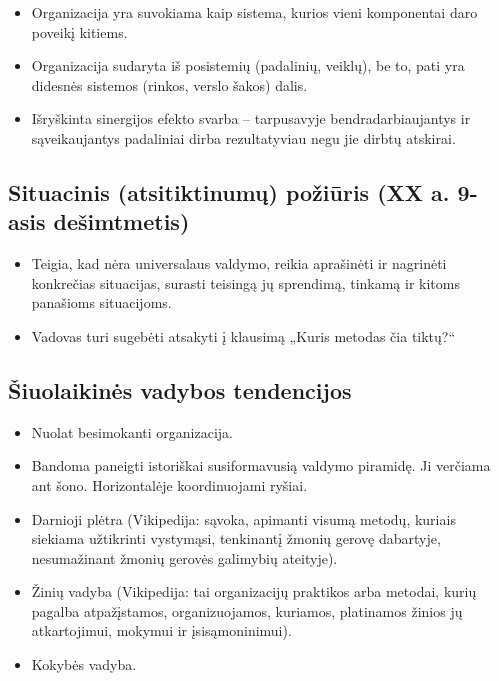 \begin{itemize}
  \item Organizacija yra suvokiama kaip sistema, kurios vieni komponentai
    daro poveikį kitiems.
  \item Organizacija sudaryta iš posistemių (padalinių, veiklų), be to,
    pati yra didesnės sistemos (rinkos, verslo šakos) dalis.
  \item Išryškinta sinergijos efekto svarba – tarpusavyje 
    bendradarbiaujantys ir sąveikaujantys padaliniai dirba rezultatyviau
    negu jie dirbtų atskirai.
\end{itemize}

\subsection{Situacinis (atsitiktinumų) požiūris (XX a. 9-asis dešimtmetis)}

\begin{itemize}
  \item Teigia, kad nėra universalaus valdymo, reikia aprašinėti ir
    nagrinėti konkrečias situacijas, surasti teisingą jų sprendimą,
    tinkamą ir kitoms panašioms situacijoms.
  \item Vadovas turi sugebėti atsakyti į klausimą „Kuris metodas čia
    tiktų?“
\end{itemize}

\subsection{Šiuolaikinės vadybos tendencijos}

\begin{itemize}
  \item Nuolat besimokanti organizacija.
  \item Bandoma paneigti istoriškai susiformavusią valdymo piramidę.
    Ji verčiama ant šono. Horizontalėje koordinuojami ryšiai.
  \item Darnioji plėtra (Vikipedija: sąvoka, apimanti visumą metodų, kuriais
    siekiama užtikrinti vystymąsi, tenkinantį žmonių gerovę dabartyje,
    nesumažinant žmonių gerovės galimybių ateityje).
  \item Žinių vadyba (Vikipedija: tai organizacijų praktikos arba metodai,
    kurių pagalba atpažįstamos, organizuojamos, kuriamos, platinamos žinios
    jų atkartojimui, mokymui ir įsisąmoninimui).
  \item Kokybės vadyba.
\end{itemize}

